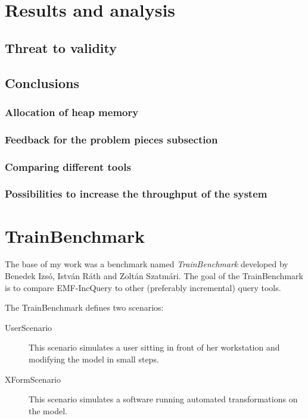 \section{Results and analysis}

\subsection{Threat to validity}

\subsection{Conclusions}

\subsubsection{Allocation of heap memory}

\subsubsection{Feedback for the problem pieces subsection}

\subsubsection{Comparing different tools}

\subsubsection{Possibilities to increase the throughput of the system}






\section{TrainBenchmark}

The base of my work was a benchmark named \textit{TrainBenchmark} developed by Benedek Izsó, István Ráth and Zoltán Szatmári. The goal of the TrainBenchmark is to compare EMF-IncQuery \cite{incquery} to other (preferably incremental) query tools.

The TrainBenchmark defines two scenarios:

\begin{description}
  \item[UserScenario] This scenario simulates a user sitting in front of her workstation and modifying the model in small steps.
  \item[XFormScenario] This scenario simulates a software running automated transformations on the model.
\end{description}

